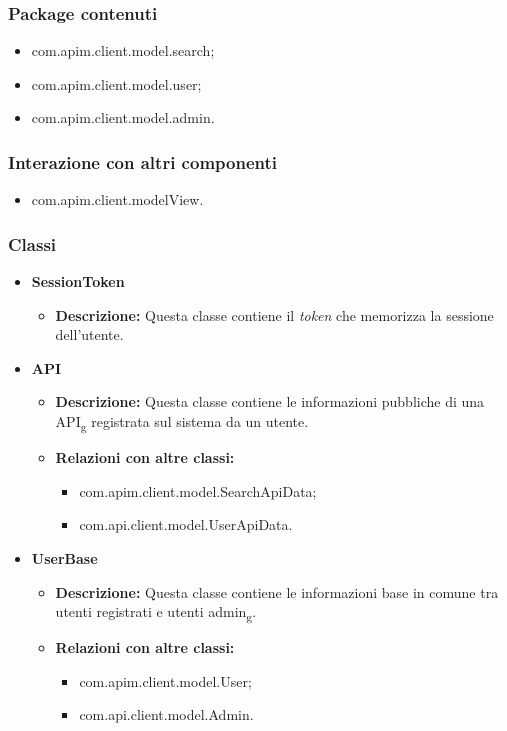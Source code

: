 {{		\subsubsection{Package contenuti}{
			\begin{itemize}
				\item com.apim.client.model.search;
				\item com.apim.client.model.user;
				\item com.apim.client.model.admin.
			\end{itemize}
		}
		\subsubsection{Interazione con altri componenti}{
			\begin{itemize}
				\item com.apim.client.modelView.
			\end{itemize}
		\subsubsection{Classi}
			\begin{itemize}
				\item \textbf{SessionToken}
					\begin{itemize}
						\item \textbf{Descrizione:} Questa classe contiene il \textit{token} che memorizza la sessione dell'utente.
					\end{itemize}
				\item \textbf{API}
					\begin{itemize}
						\item \textbf{Descrizione:} Questa classe contiene le informazioni pubbliche di una API\textsubscript{g} registrata sul sistema da un utente.
						\item \textbf{Relazioni con altre classi:}
						\begin{itemize}
							\item com.apim.client.model.SearchApiData;
							\item com.api.client.model.UserApiData.
						\end{itemize}
					\end{itemize}
				\item \textbf{UserBase}
					\begin{itemize}
						\item \textbf{Descrizione:} Questa classe contiene le informazioni base in comune tra utenti registrati e utenti admin\textsubscript{g}.
						\item \textbf{Relazioni con altre classi:}
						\begin{itemize}
							\item com.apim.client.model.User;
							\item com.api.client.model.Admin.
						\end{itemize}
					\end{itemize}
			\end{itemize}
		}
	}
}

